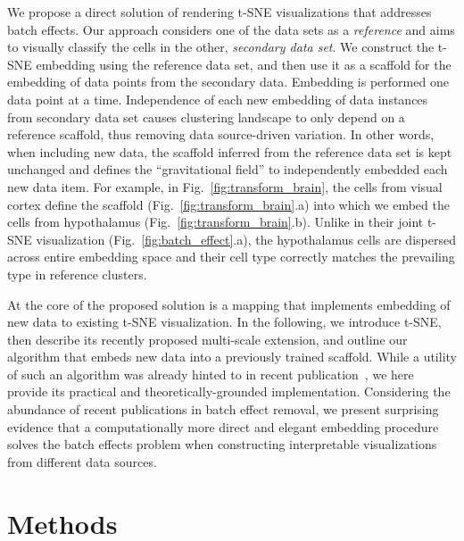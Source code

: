 \documentclass[runningheads]{llncs}
\begin{document}
We propose a direct solution of rendering t-SNE visualizations that addresses batch effects. Our approach considers one of the data sets as a {\em reference} and aims to visually classify the cells in the other, {\em secondary data set}. We construct the t-SNE embedding using the reference data set, and then use it as a scaffold for the embedding of data points from the secondary data. Embedding is performed one data point at a time. Independence of each new embedding of data instances from secondary data set causes clustering landscape to only depend on a reference scaffold, thus removing data source-driven variation. In other words, when including new data, the scaffold inferred from the reference data set is kept unchanged and defines the ``gravitational field'' to independently embedded each new data item. For example, in Fig.~\ref{fig:transform_brain}, the cells from visual cortex define the scaffold (Fig.~\ref{fig:transform_brain}.a) into which we embed the cells from hypothalamus (Fig.~\ref{fig:transform_brain}.b). Unlike in their joint t-SNE visualization (Fig.~\ref{fig:batch_effect}.a), the hypothalamus cells are dispersed across entire embedding space and their cell type correctly matches the prevailing type in reference clusters.

At the core of the proposed solution is a mapping that implements embedding of new data to existing t-SNE visualization. In the following, we introduce t-SNE, then describe its recently proposed multi-scale extension, and outline our algorithm that embeds new data into a previously trained scaffold. While a utility of such an algorithm was already hinted to in recent publication~\cite{art_of_using_tsne}, we here provide its practical and theoretically-grounded implementation. Considering the abundance of recent publications in batch effect removal, we present surprising evidence that a computationally more direct and elegant embedding procedure solves the batch effects problem when constructing interpretable visualizations from different data sources.


\section{Methods}
\end{document}

